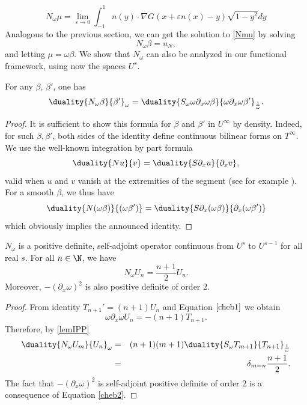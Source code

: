 \documentclass[a4paper]{article}
\begin{document}
	\[N_\omega \mu = \lim_{\varepsilon\to 0}\int_{-1}^{1} n(y)\cdot\nabla G(x + \varepsilon n(x) - y) \sqrt{1-y^2} dy\]
	Analogous to the previous section, we can get the solution to \eqref{Nmu} by solving 
	\begin{equation}
	N_\omega \beta = u_N,
	\label{Nomegabeta}
	\end{equation}
	and letting $\mu = \omega \beta$. 
	We show that $N_\omega$ can also be analyzed in our functional framework, using now the spaces $U^s$. 
	\begin{Lem}
		\label{lemIPP}
		For any $\beta$, $\beta'$, one has 
		\[\duality{N_\omega \beta}{ \beta'}_\omega = \duality{S_\omega \omega \partial_x \omega \beta}{\omega \partial_x \omega \beta'}_\frac{1}{\omega}.\]
		\begin{proof}
			It is sufficient to show this formula for $\beta$ and $\beta'$ in $U^{\infty}$ by density. Indeed, for such $\beta, \beta'$, both sides of the identity define continuous bilinear forms on $T^{\infty}$. We use the well-known integration by part formula
			\[\duality{N u}{v} = \duality{S\partial_x u}{\partial_x v},\]
			valid when $u$ and $v$ vanish at the extremities of the segment (see for example \cite{bruno2012second}). 
			For a smooth $\beta$, we thus have
			\[ \duality{N (\omega \beta)}{ (\omega \beta')} = \duality{S \partial_x(\omega \beta)}{\partial_x (\omega \beta')}\] 
			which obviously implies the announced identity. 
		\end{proof}
	\end{Lem}
	\begin{Prop}
		$N_\omega$ is a positive definite, self-adjoint operator continuous from $U^s$ to $U^{s-1}$ for all real $s$. For all $n \in \N$, we have 
		\[N_\omega U_n = \frac{n+1}{2}U_n.\]
		Moreover, $-(\partial_x\omega)^2$ is also positive definite of order $2$.
		\label{NUn}
	\end{Prop}
	\begin{proof}
		From identity $T_{n+1}' = (n+1)U_n$ and Equation $\eqref{cheb1}$ we obtain
		\begin{equation*}
		\omega \partial_x \omega U_n = -(n+1) T_{n+1}.
		\end{equation*}
		Therefore, by \autoref{lemIPP}
		\begin{eqnarray*}
			\duality{N_\omega U_m}{U_n}_\omega & = & (n+1)(m+1)\duality{S_\omega T_{m+1}}{T_{n+1}}_\frac{1}{\omega}\\
			&=& \delta_{m=n} \frac{n+1}{2}.	
		\end{eqnarray*}
		The fact that $-(\partial_x \omega)^2$ is self-adjoint positive definite of order $2$ is a consequence of Equation \eqref{cheb2}.
	\end{proof}
	
\end{document}
